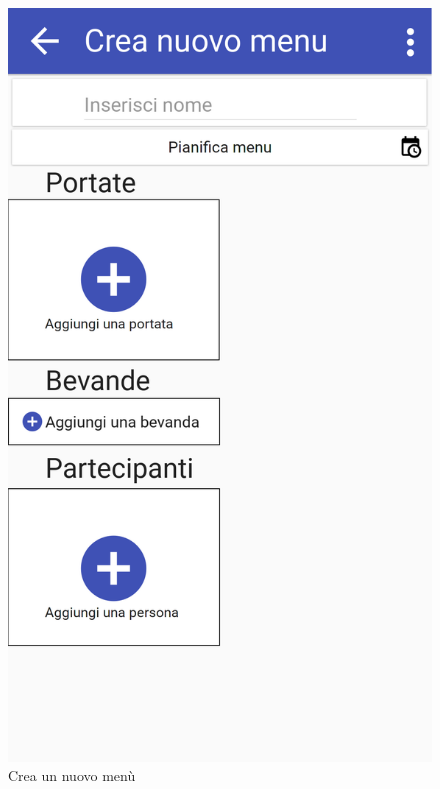 \begin{figure}[H]
	\begin{minipage}{.49\textwidth}
		\includegraphics[width=\textwidth]{img/wireframe/crea_nuovo_menu.png}
		\caption{Crea un nuovo menù}
		\label{fig:crea_nuovo}
	\end{minipage}
	\hfill
	\begin{minipage}{.49\textwidth}

\end{minipage}
\end{figure}
